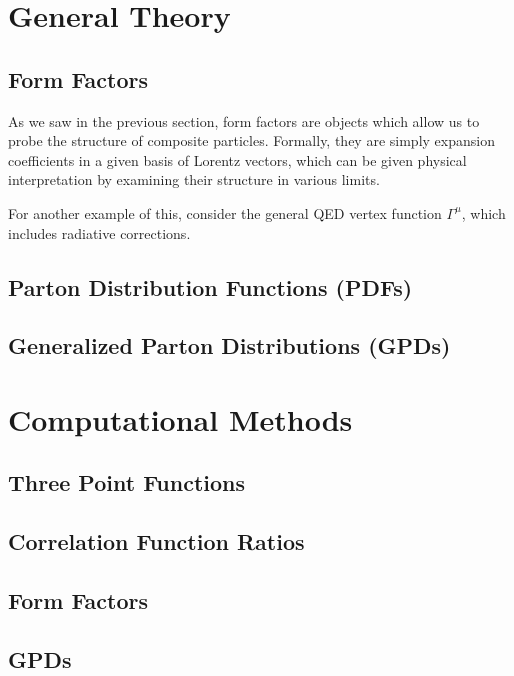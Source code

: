 \documentclass[11pt, oneside]{article}   	%
\theoremstyle{definition}
\begin{document}
\newpage
\section{General Theory}

\subsection{Form Factors}

As we saw in the previous section, form factors are objects which allow us to probe the structure of composite particles. Formally, 
they are simply expansion coefficients in a given basis of Lorentz vectors, which can be given physical interpretation by 
examining their structure in various limits. 

For another example of this, consider the general QED vertex function $\Gamma^\mu$, which includes radiative corrections. 

\subsection{Parton Distribution Functions (PDFs)}

\subsection{Generalized Parton Distributions (GPDs)}

\newpage
\section{Computational Methods}

\subsection{Three Point Functions}

\subsection{Correlation Function Ratios}

\subsection{Form Factors}

\subsection{GPDs}
\end{document}
